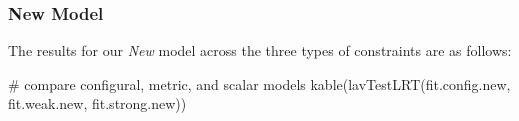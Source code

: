 \documentclass[
  letterpaper,
  DIV=11,
  numbers=noendperiod]{scrartcl}
\newenvironment{Shaded}{\begin{snugshade}}{\end{snugshade}}
\newcommand{\CommentTok}[1]{\textcolor[rgb]{0.37,0.37,0.37}{#1}}
\newcommand{\FunctionTok}[1]{\textcolor[rgb]{0.28,0.35,0.67}{#1}}
\newcommand{\NormalTok}[1]{\textcolor[rgb]{0.00,0.23,0.31}{#1}}
\begin{document}
\subsubsection{New Model}\label{new-model}

The results for our \emph{New} model across the three types of
constraints are as follows:

\begin{Shaded}
\begin{Highlighting}[]
\CommentTok{\# compare configural, metric, and scalar models}
\FunctionTok{kable}\NormalTok{(}\FunctionTok{lavTestLRT}\NormalTok{(fit.config.new, }
\NormalTok{                 fit.weak.new, }
\NormalTok{                 fit.strong.new))}
\end{Highlighting}
\end{Shaded}
\end{document}

